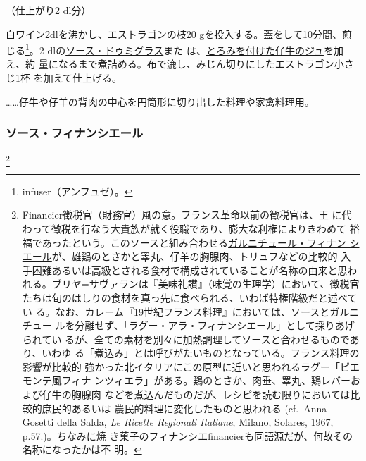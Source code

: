 \begin{recette}
（仕上がり2\undemi{} dl分）

白ワイン2dlを沸かし、エストラゴンの枝20 gを投入する。蓋をして10分間、煎
じる\footnote{infuser（アンフュゼ）。}。2\undemi{}
dlの\protect\hyperlink{sauce-demi-glace}{ソース・ドゥミグラス}また
は、\protect\hyperlink{jus-de-veau-lie}{とろみを付けた仔牛のジュ}を加え、約\deuxtiers{}
量になるまで煮詰める。布で漉し、みじん切りにしたエストラゴン小さじ1杯
を加えて仕上げる。

\ldots{}\ldots{}仔牛や仔羊の背肉の中心を円筒形に切り出した料理や家禽料理用。

\hypertarget{sauce-financiere}{%
\subsubsection{ソース・フィナンシエール}\label{sauce-financiere}}

\footnote{Financier徴税官（財務官）風の意。フランス革命以前の徴税官は、王
  に代わって徴税を行なう大貴族が就く役職であり、膨大な利権によりきわめて
  裕福であったという。このソースと組み合わせる\protect\hyperlink{garniture-financiere}{ガルニチュール・フィナン
  シエール}が、雄鶏のとさかと睾丸、仔羊の胸腺肉、トリュフなどの比較的
  入手困難あるいは高級とされる食材で構成されていることが名称の由来と思わ
  れる。ブリヤ=サヴァランは『美味礼讃』（味覚の生理学）において、徴税官
  たちは旬のはしりの食材を真っ先に食べられる、いわば特権階級だと述べてい
  る。なお、カレーム『19世紀フランス料理』においては、ソースとガルニチュー
  ルを分離せず、「ラグー・アラ・フィナンシエール」として採りあげられてい
  るが、全ての素材を別々に加熱調理してソースと合わせるものであり、いわゆ
  る「煮込み」とは呼びがたいものとなっている。フランス料理の影響が比較的
  強かった北イタリアにこの原型に近いと思われるラグー「ピエモンテ風フィナ
  ンツィエラ」がある。鶏のとさか、肉垂、睾丸、鶏レバーおよび仔牛の胸腺肉
  などを煮込んだものだが、レシピを読む限りにおいては比較的庶民的あるいは
  農民的料理に変化したものと思われる (cf.~Anna Gosetti della Salda,
  \emph{Le Ricette Regionali Italiane}, Milano, Solares, 1967,
  p.57.)。ちなみに焼
  き菓子のフィナンシエfinancierも同語源だが、何故その名称になったかは不
  明。}



\end{recette}
